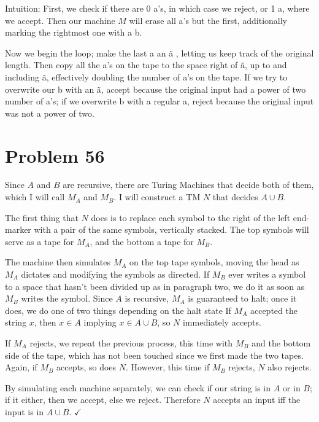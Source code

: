 \documentclass[11pt]{article}
\begin{document}
Intuition: First, we check if there are 0 a's, in which case we reject, or 1 a, where we accept. Then our machine $M$ will erase all a's but the first, additionally marking the rightmost one with a b. 

Now we begin the loop; make the last a an \~a , letting us keep track of the original length. Then copy all the a's on the tape to the space right of \~a, up to and including \~a, effectively doubling the number of a's on the tape. If we try to overwrite our b with an \~a, accept because the original input had a power of two number of a's; if we overwrite b with a regular a, reject because the original input was not a power of two.





\section*{Problem 56}

Since $A$ and $B$ are recursive, there are Turing Machines that decide both of them, which I will call $M_A$ and $M_B$. I will construct a TM $N$ that decides $A \cup B$.

The first thing that $N$ does is to replace each symbol to the right of the left end-marker with a pair of the same symbols, vertically stacked. The top symbols will serve as a tape for $M_A$, and the bottom a tape for $M_B$.

The machine then simulates $M_A$ on the top tape symbols, moving the head as $M_A$ dictates and modifying the symbols as directed. If $M_B$ ever writes a symbol to a space that hasn't been divided up as in paragraph two, we do it as soon as $M_B$ writes the symbol. Since $A$ is recursive, $M_A$ is guaranteed to halt; once it does, we do one of two things depending on the halt state If $M_A$ accepted the string $x$, then $x \in A$ implying $x \in A \cup B$, so $N$ immediately accepts. 

If $M_A$ rejects, we repeat the previous process, this time with $M_B$ and the bottom side of the tape, which has not been touched since we first made the two tapes. Again, if $M_B$ accepts, so does $N$. However, this time if $M_B$ rejects, $N$ also rejects.

By simulating each machine separately, we can check if our string is in $A$ or in $B$; if it either, then we accept, else we reject. Therefore $N$ accepts an input iff the input is in $A \cup B$. $\checkmark$
\end{document}
